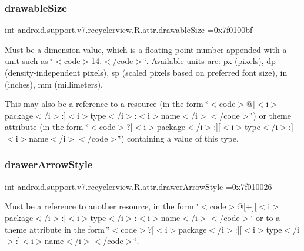 \subsubsection{\texorpdfstring{drawable\+Size}{drawableSize}}
{\footnotesize\ttfamily int android.\+support.\+v7.\+recyclerview.\+R.\+attr.\+drawable\+Size =0x7f0100bf\hspace{0.3cm}{\ttfamily [static]}}

Must be a dimension value, which is a floating point number appended with a unit such as \char`\"{}$<$code$>$14.\+5sp$<$/code$>$\char`\"{}. Available units are\+: px (pixels), dp (density-\/independent pixels), sp (scaled pixels based on preferred font size), in (inches), mm (millimeters). 

This may also be a reference to a resource (in the form \char`\"{}$<$code$>$@\mbox{[}$<$i$>$package$<$/i$>$\+:\mbox{]}$<$i$>$type$<$/i$>$\+:$<$i$>$name$<$/i$>$$<$/code$>$\char`\"{}) or theme attribute (in the form \char`\"{}$<$code$>$?\mbox{[}$<$i$>$package$<$/i$>$\+:\mbox{]}\mbox{[}$<$i$>$type$<$/i$>$\+:\mbox{]}$<$i$>$name$<$/i$>$$<$/code$>$\char`\"{}) containing a value of this type. \mbox{\label{classandroid_1_1support_1_1v7_1_1recyclerview_1_1R_1_1attr_a5f7cfa2a2986808f52988cb9978f4e6a}} 
\subsubsection{\texorpdfstring{drawer\+Arrow\+Style}{drawerArrowStyle}}
{\footnotesize\ttfamily int android.\+support.\+v7.\+recyclerview.\+R.\+attr.\+drawer\+Arrow\+Style =0x7f010026\hspace{0.3cm}{\ttfamily [static]}}

Must be a reference to another resource, in the form \char`\"{}$<$code$>$@\mbox{[}+\mbox{]}\mbox{[}$<$i$>$package$<$/i$>$\+:\mbox{]}$<$i$>$type$<$/i$>$\+:$<$i$>$name$<$/i$>$$<$/code$>$\char`\"{} or to a theme attribute in the form \char`\"{}$<$code$>$?\mbox{[}$<$i$>$package$<$/i$>$\+:\mbox{]}\mbox{[}$<$i$>$type$<$/i$>$\+:\mbox{]}$<$i$>$name$<$/i$>$$<$/code$>$\char`\"{}. \mbox{\label{classandroid_1_1support_1_1v7_1_1recyclerview_1_1R_1_1attr_a800c7c41bcf94e57e9976a614015fa3f}} 
